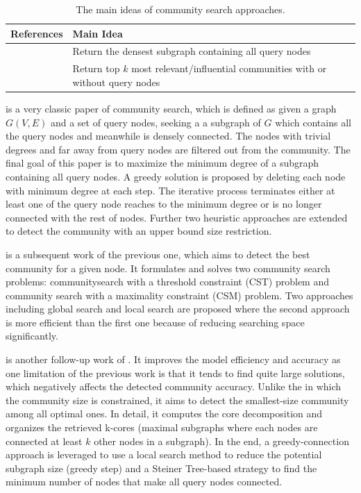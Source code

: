 \begin{table}
	\centering
	\begin{tabular}{|p{4.5cm}|p{9.5cm}|} \hline
		\textbf{References} &  \textbf{Main Idea} \\ \hline
		\cite{sozio2010community,cui2014local,barbieri2015efficient,wu2015robust,huang2015approximate} & Return the densest subgraph containing all query nodes\\ \hline
		\cite{chen2012dense,qin2015locally,lancichinetti2011finding,huang2014querying,zheng2017finding,yan2019constrained,li2015influential}& Return top $k$ most relevant/influential communities with or without query nodes \\ \hline 
	\end{tabular}
	\caption{The main ideas of community search approaches.}
	\label{tab:c2_search}
	
\end{table} 


\cite{sozio2010community} is a very classic paper of community search, which is defined as given a graph $G(V,E)$ and a set of query nodes, seeking a a subgraph of $G$ which contains all the query nodes and meanwhile is densely connected. The nodes with trivial degrees and far away from query nodes are filtered out from the community. The final goal of this paper is to maximize the minimum degree of a subgraph containing all query nodes. A greedy solution is proposed by deleting each node with minimum degree at each step. The iterative process terminates either at least one of the query node reaches to the minimum degree or is no longer connected with the rest of nodes. Further two heuristic approaches are extended to detect the community with an upper bound size restriction. 

\cite{cui2014local} is a subsequent work of the previous one, which aims to detect the best community for a given node. It formulates and solves two community search problems: communitysearch with a threshold constraint (CST) problem and community search with a maximality constraint (CSM) problem. Two approaches including global search and local search are proposed where the second approach is more efficient than the first one because of reducing searching space significantly.  

\cite{barbieri2015efficient} is another follow-up work of \cite{sozio2010community}. It improves the model efficiency and accuracy as one limitation of the previous work  is that it tends to find quite large solutions, which negatively affects the detected community accuracy. Unlike the \cite{sozio2010community} in which the community size is constrained, it aims to detect the smallest-size community among all optimal ones. In detail, it computes the core decomposition and organizes the retrieved k-cores (maximal subgraphs where each nodes are connected at least $k$ other nodes in a subgraph). In the end, a greedy-connection approach is leveraged to use a local search method to reduce the potential subgraph size (greedy step) and a Steiner Tree-based strategy to find the minimum number of nodes that make all query nodes connected.
 
